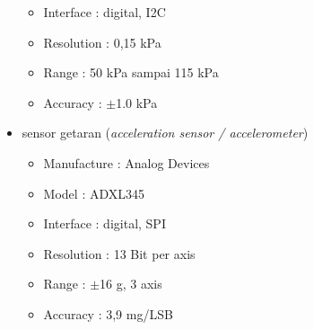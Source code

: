 \begin{itemize}
\begin{itemize}
    			\item Interface : digital, I2C
    			\item Resolution : 0,15 kPa
    			\item Range : 50 kPa sampai 115 kPa
    			\item Accuracy : $\pm$1.0 kPa
			\end{itemize}
		\item sensor getaran ({\it acceleration sensor / accelerometer}) 
			\begin{itemize}
    			\item Manufacture : Analog Devices
    			\item Model : ADXL345
    			\item Interface : digital, SPI
    			\item Resolution : 13 Bit per axis
    			\item Range : $\pm$16 g, 3 axis
    			\item Accuracy : 3,9 mg/LSB
			\end{itemize}
	\end{itemize}







